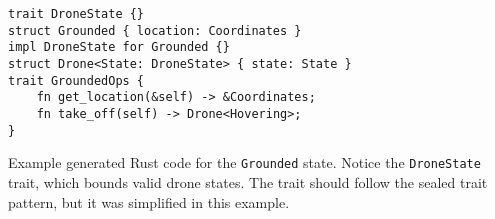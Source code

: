 
\begin{listing}
    \centering
    \begin{verbatim}
trait DroneState {}
struct Grounded { location: Coordinates }
impl DroneState for Grounded {}
struct Drone<State: DroneState> { state: State }
trait GroundedOps {
    fn get_location(&self) -> &Coordinates;
    fn take_off(self) -> Drone<Hovering>;
}
    \end{verbatim}
    \caption{
        Example generated Rust code for the \texttt{Grounded} state.
        Notice the \texttt{DroneState} trait, which bounds valid drone states.
        The trait should follow the sealed trait pattern, but it was simplified in this example.
    }
    \label{lst:dsl-typestate-generated}
\end{listing}